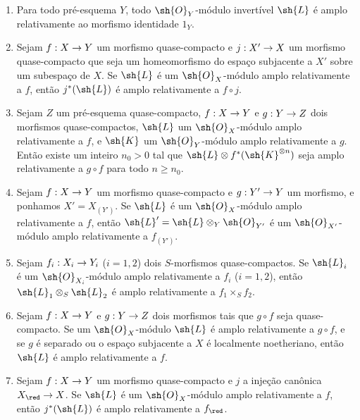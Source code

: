 \documentclass[oneside,10pt]{amsart}
\makeatletter
\renewcommand{\geq}{\geqslant}
\newcommand{\ega@arrow}[2]{\mathchoice{#1}{#2}{#2}{#2}}
\renewcommand{\to}{\ega@arrow{\longrightarrow}{\rightarrow}}
\newcommand{\oldpage}[2][]{\marginnote{\normalfont\footnotesize\textbf{#1}~|~#2}\ignorespaces}
\let\EGAOriginalLabel\label
\renewcommand{\label}[1]{\phantomsection\EGAOriginalLabel{#1}}
\makeatother
\begin{document}
\begin{proposition}[4.6.13]
\label{II.4.6.13}
\begin{enumerate}
  \item[\rm{(i)}] Para todo pré-esquema $Y$, todo $\sh{O}_Y$-módulo invertível $\sh{L}$ é amplo relativamente ao morfismo identidade $1_Y$.
  \item[\rm{(i \emph{bis})}] Sejam $f:X\to Y$ um morfismo quase-compacto e $j:X'\to X$ um morfismo quase-compacto que seja um homeomorfismo do espaço subjacente a $X'$ sobre um subespaço de $X$.
    Se $\sh{L}$ é um $\sh{O}_X$-módulo amplo relativamente a $f$, então $j^*(\sh{L})$ é amplo relativamente a $f\circ j$.
  \item[\rm{(ii)}] Sejam $Z$ um pré-esquema quase-compacto, $f:X\to Y$ e $g:Y\to Z$ dois morfismos quase-compactos, $\sh{L}$ um $\sh{O}_X$-módulo amplo relativamente a $f$, e $\sh{K}$ um $\sh{O}_Y$-módulo amplo relativamente a $g$.
    Então existe um inteiro $n_0>0$ tal que $\sh{L}\otimes f^*(\sh{K}^{\otimes n})$ seja amplo relativamente a $g\circ f$ para todo $n\geq n_0$.
  \item[\rm{(iii)}] Sejam $f:X\to Y$ um morfismo quase-compacto e $g:Y'\to Y$ um morfismo, e ponhamos $X'=X_{(Y')}$.
    Se $\sh{L}$ é um $\sh{O}_X$-módulo amplo relativamente a $f$, então $\sh{L}'=\sh{L}\otimes_Y\sh{O}_{Y'}$ é um $\sh{O}_{X'}$-módulo amplo relativamente a $f_{(Y')}$.
  \item[\rm{(iv)}] Sejam $f_i:X_i\to Y_i$ ($i=1,2$) dois $S$-morfismos quase-compactos.
    Se $\sh{L}_i$ é um $\sh{O}_{X_i}$-módulo amplo relativamente a $f_i$ ($i=1,2$), então $\sh{L}_1\otimes_S\sh{L}_2$ é amplo relativamente a $f_1\times_S f_2$.
  \item[\rm{(v)}] Sejam $f:X\to Y$ e $g:Y\to Z$ dois morfismos tais que $g\circ f$ seja quase-compacto.
    Se um
\oldpage[II]{92}
    $\sh{O}_X$-módulo $\sh{L}$ é amplo relativamente a $g\circ f$, e se $g$ é separado ou o espaço subjacente a $X$ é localmente noetheriano, então $\sh{L}$ é amplo relativamente a $f$.
  \item[\rm{(vi)}] Sejam $f:X\to Y$ um morfismo quase-compacto e $j$ a injeção canônica $X_\red\to X$.
    Se $\sh{L}$ é um $\sh{O}_X$-módulo amplo relativamente a $f$, então $j^*(\sh{L})$ é amplo relativamente a $f_\red$.
\end{enumerate}
\end{proposition}
\end{document}
